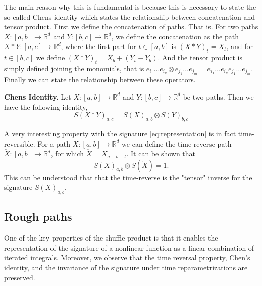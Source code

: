 The main reason why this is fundamental is because this is necessary to state the so-called Chens identity which states the relationship between concatenation and tensor product. First we define the concatenation of paths. That is. For two paths $X: \left[ a,b \right] \to \mathbb{R} ^{d}$  and $Y : \left[ b,c \right]
\to  \mathbb{R} ^{d}$, we define the concatenation as the path $X * Y : \left[ a,c \right]  \to \mathbb{R} ^{d}$, where the first part for $t \in  \left[ a,b \right] $ is $( X* Y) _{t} = X_{t}$, and for $t \in  \left[ b,c \right] $ we define $( X*Y)
_{t} = X_{b} + ( Y_{t} - Y_{b}) $. And the tensor product is simply defined joining the monomials, that is  $e_{i_{1}} \ldots e_{i_{k}} \otimes e_{j_{1}} \ldots e_{j_{m}}  = e_{i_{1}} \ldots e_{i_{k}}  e_{j_{1}} \ldots e_{j_{m}}$. Finally we can
state the relationship between these operators.

\begin{theorem}
    \textbf{Chens Identity.} Let $X: \left[ a,b \right] \to  \mathbb{R} ^{d}$ and $Y: \left[ b,c \right] \to \mathbb{R} ^{d}$ be two paths. Then we have the following identity,
    \begin{equation}
        S( X*Y) _{a,c} = S( X) _{a,b} \otimes  S( Y) _{b,c}
    \end{equation}

\end{theorem}


A very interesting property with the signature \eqref{eq:representation} is in fact time-reversible. For a path $X: \left[ a,b \right]  \to \mathbb{R} ^{d}$ we can define the time-reverse path $\overleftarrow{X}: \left[ a,b \right]  \to  \mathbb{R} ^{d} $, for
which $ \overleftarrow{X}  = X_{a+b -t}$. It can be shown that \begin{equation}
    S( X) _{a,b} \otimes S( \overleftarrow{X}) = 1.
\end{equation}
This can be understood that that the time-reverse is the "tensor" inverse for the signature $S( X) _{a,b}$.



\subsection{Rough paths}%
\label{sub:rough_paths}





One of the key properties of the shuffle product is that it enables the representation of the signature of a nonlinear function as a linear combination of iterated integrals. Moreover, we observe that the time reversal property, Chen's identity, and the invariance of the signature under time reparametrizations are preserved.

